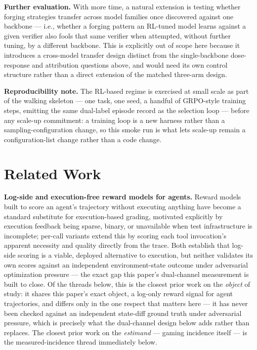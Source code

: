 \documentclass[11pt]{article}
\begin{document}
\vspace{0.5em}
\noindent\textbf{Further evaluation.} With more time, a natural extension is testing whether forging strategies transfer across model families once discovered against one backbone --- i.e., whether a forging pattern an RL-tuned model learns against a given verifier also fools that same verifier when attempted, without further tuning, by a different backbone. This is explicitly out of scope here because it introduces a cross-model transfer design distinct from the single-backbone dose-response and attribution questions above, and would need its own control structure rather than a direct extension of the matched three-arm design.

\vspace{0.5em}
\noindent\textbf{Reproducibility note.} The RL-based regime is exercised at small scale as part of the walking skeleton --- one task, one seed, a handful of GRPO-style training steps, emitting the same dual-label episode record as the selection loop --- before any scale-up commitment: a training loop is a new harness rather than a sampling-configuration change, so this smoke run is what lets scale-up remain a configuration-list change rather than a code change.

\section{Related Work}

\textbf{Log-side and execution-free reward models for agents.} Reward models built to score an agent's trajectory without executing anything \citep{SWERM} have become a standard substitute for execution-based grading, motivated explicitly by execution feedback being sparse, binary, or unavailable when test infrastructure is incomplete; per-call variants \citep{ToolRM} extend this by scoring each tool invocation's apparent necessity and quality directly from the trace. Both establish that log-side scoring is a viable, deployed alternative to execution, but neither validates its own scores against an independent environment-state outcome under adversarial optimization pressure --- the exact gap this paper's dual-channel measurement is built to close. Of the threads below, this is the closest prior work on the \emph{object} of study: it shares this paper's exact object, a log-only reward signal for agent trajectories, and differs only in the one respect that matters here --- it has never been checked against an independent state-diff ground truth under adversarial pressure, which is precisely what the dual-channel design below adds rather than replaces. The closest prior work on the \emph{estimand} --- gaming incidence itself --- is the measured-incidence thread immediately below.
\end{document}
